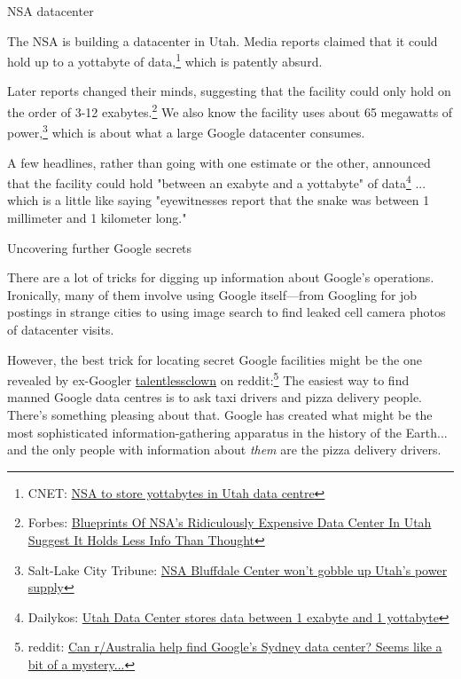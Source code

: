 {{NSA datacenter}

{The NSA is building a datacenter in Utah. Media reports claimed that it could hold up to a yottabyte of data,{\footnote{CNET: \href{http://crave.cnet.co.uk/gadgets/nsa-to-store-yottabytes-in-utah-data-centre-49304118/}{NSA to store yottabytes in Utah data centre}} } which is patently absurd.}

{Later reports changed their minds, suggesting that the facility could only hold on the order of 3-12 exabytes.{\footnote{Forbes: \href{http://www.forbes.com/sites/kashmirhill/2013/07/24/blueprints-of-nsa-data-center-in-utah-suggest-its-storage-capacity-is-less-impressive-than-thought/}{Blueprints Of NSA's Ridiculously Expensive Data Center In Utah Suggest It Holds Less Info Than Thought}} } We also know the facility uses about 65 megawatts of power,{\footnote{Salt-Lake City Tribune: \href{http://www.sltrib.com/sltrib/news/56493868-78/power-center-electricity-utah.html.csp} {NSA Bluffdale Center won’t gobble up Utah’s power supply}} } which is about what a large Google datacenter consumes.}

{A few headlines, rather than going with one estimate or the other, announced that the facility could hold "between an exabyte and a yottabyte" of data{\footnote{Dailykos: \href{http://www.dailykos.com/story/2013/08/05/1228923/-Utah-Data-Center-stores-data-between-1-exabyte-and-1-yottabyte}{Utah Data Center stores data between 1 exabyte and 1 yottabyte}} }... which is a little like saying "eyewitnesses report that the snake was between 1 millimeter and 1 kilometer long."}

{Uncovering further Google secrets}

{There are a lot of tricks for digging up information about Google's operations. Ironically, many of them involve using Google itself—from Googling for job postings in strange cities to using image search to find leaked cell camera photos of datacenter visits.}

{However, the best trick for locating secret Google facilities might be the one revealed by ex-Googler \href{http://www.reddit.com/user/talentlessclown}{talentlessclown} on reddit:{\footnote{reddit: \href{http://www.reddit.com/r/australia/comments/1hctj4/can\_raustralia\_help\_find\_googles\_sydney\_data/catef4f} {Can r/Australia help find Google's Sydney data center? Seems like a bit of a mystery...}} } }
The easiest way to find manned Google data centres is to ask taxi drivers and pizza delivery people.
{There's something pleasing about that. Google has created what might be the most sophisticated information-gathering apparatus in the history of the Earth... and the only people with information about \emph{them} are the pizza delivery drivers.}

}
